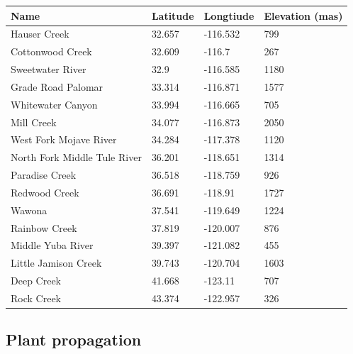 \documentclass[11pt, oneside]{article}
\begin{document}
\begin{table}[ht]
   \centering
   \begin{tabular}{@{} llll @{}}
      \toprule
  Name  & Latitude  & Longtiude  & Elevation (mas) \\
      \midrule
	Hauser Creek & 32.657	& 
    -116.532	& 799   \\
	Cottonwood Creek	& 32.609 & 
    -116.7	& 267   \\
	Sweetwater River	& 32.9 & 
    -116.585	& 1180   \\
	Grade Road Palomar & 33.314 &
    -116.871	& 1577   \\
	Whitewater Canyon & 33.994 & 
    -116.665	& 705   \\
	Mill Creek	& 34.077 & 
    -116.873	& 2050   \\
	West Fork Mojave River	& 34.284 & 
    -117.378	& 1120   \\
	North Fork Middle Tule River	& 36.201 & 
    -118.651	& 1314   \\
	Paradise Creek	& 36.518 & 
    -118.759	& 926   \\
	Redwood Creek	& 36.691 & 
    -118.91	& 1727   \\
	Wawona  & 37.541 & 
    -119.649	& 1224   \\
	Rainbow Creek	& 37.819 & 
    -120.007	& 876   \\
	Middle Yuba River	& 39.397 & 
    -121.082	& 455   \\
	Little Jamison Creek	& 39.743 & 
    -120.704	& 1603   \\
	Deep Creek	& 41.668 & 
    -123.11	& 707   \\
	Rock Creek	& 43.374 & 
    -122.957	& 326   \\
	\bottomrule
	\end{tabular}
	\label{table:Table_FocalPops}
\end{table}

\subsection*{Plant propagation}
\end{document}
